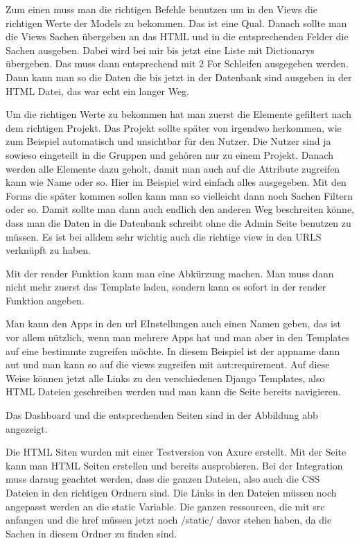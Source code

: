\documentclass[11pt,a4paper]{report}
\begin{document}
Zum einen muss man die richtigen Befehle benutzen um in den Views die richtigen Werte der Models zu bekommen. Das ist eine Qual. Danach sollte man die Views Sachen übergeben an das HTML und in die entsprechenden Felder die Sachen ausgeben. Dabei wird bei mir bis jetzt eine Liste mit Dictionarys übergeben. Das muss dann entsprechend mit 2 For Schleifen ausgegeben werden. Dann kann man so die Daten die bis jetzt in der Datenbank sind ausgeben in der HTML Datei, das war echt ein langer Weg. 

Um die richtigen Werte zu bekommen hat man zuerst die Elemente gefiltert nach dem richtigen Projekt. Das Projekt sollte später von irgendwo herkommen, wie zum Beispiel automatisch und unsichtbar für den Nutzer. Die Nutzer sind ja sowieso eingeteilt in die Gruppen und gehören nur zu einem Projekt. Danach werden alle Elemente dazu geholt, damit man auch auf die Attribute zugreifen kann wie Name oder so. Hier im Beispiel wird einfach alles ausgegeben. Mit den Forms die später kommen sollen kann man so vielleicht dann noch Sachen Filtern oder so. Damit sollte man dann auch endlich den anderen Weg beschreiten könne, dass man die Daten in die Datenbank schreibt ohne die Admin Seite benutzen zu müssen. Es ist bei alldem sehr wichtig auch die richtige view in den URLS verknüpft zu haben. 

Mit der render Funktion kann man eine Abkürzung machen. Man muss dann nicht mehr zuerst das Template laden, sondern kann es sofort in der render Funktion angeben.

Man kann den Apps in den url EInstellungen auch einen Namen geben, das ist vor allem nützlich, wenn man mehrere Apps hat und man aber in den Templates auf eine bestimmte zugreifen möchte. In diesem Beispiel ist der appname dann aut und man kann so auf die views zugreifen mit aut:requirement. Auf diese Weise können jetzt alle Links zu den verschiedenen Django Templates, also HTML Dateien geschreiben werden und man kann die Seite bereits navigieren.

Das Dashboard und die entsprechenden Seiten sind in der Abbildung abb angezeigt.

Die HTML Siten wurden mit einer Testversion von Axure erstellt. Mit der Seite kann man HTML Seiten erstellen und bereits ausprobieren. Bei der Integration muss daraug geachtet werden, dass die ganzen Dateien, also auch die CSS Dateien in den richtigen Ordnern sind. Die Links in den Dateien müssen noch angepasst werden an die static Variable. Die ganzen ressourcen, die mit src anfangen und die href müssen jetzt noch /static/ davor stehen haben, da die Sachen in diesem Ordner zu finden sind.
\end{document}
